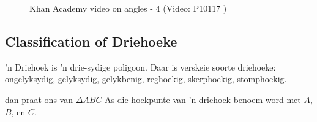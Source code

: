    \setcounter{subfigure}{0}
	\begin{figure}[H] %
    \textnormal{Khan Academy video on angles - 4}\vspace{.1in} \nopagebreak
  \label{m38380*yt-media4}\label{m38380*yt-video4}
             { (Video:  P10117
)}
      \vspace{2pt}
    \vspace{.1in}
 \end{figure}  
        \subsection*{Classification of Driehoeke}
'n Driehoek is ’n drie-sydige poligoon. Daar is verskeie soorte driehoeke: ongelyksydig, gelyksydig, gelykbenig, reghoekig, skerphoekig, stomphoekig. \par 
dan praat ons van $\Delta ABC$ 
As die hoekpunte van ’n driehoek benoem word met $A$,
$B$, en $C$.\par 
